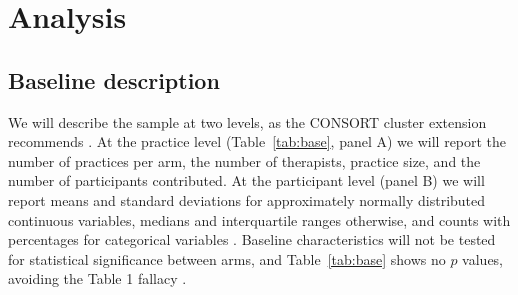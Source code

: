 \documentclass[11pt,a4paper]{article}
\begin{document}
\section{Analysis}

\subsection{Baseline description}

We will describe the sample at two levels, as the CONSORT cluster extension
recommends \citep{campbell2012}. At the practice level (Table~\ref{tab:base}, panel
A) we will report the number of practices per arm, the number of therapists,
practice size, and the
number of participants
contributed. At the participant level (panel B) we will report means and
standard deviations for approximately normally distributed continuous
variables, medians and interquartile ranges otherwise, and counts with
percentages for categorical variables \citep{lang2015}. Baseline characteristics will not be
tested for statistical significance between arms, and Table~\ref{tab:base}
shows no $p$ values, avoiding the Table 1 fallacy
\citep{senn1994, altman1985}.
\end{document}
